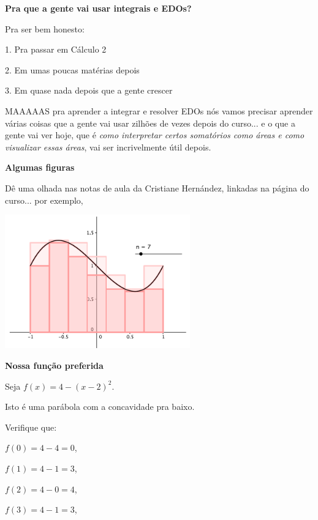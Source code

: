 \documentclass[oneside,12pt]{article}
\begin{document}
\newpage

{\bf Pra que a gente vai usar integrais e EDOs?}

Pra ser bem honesto:

1. Pra passar em Cálculo 2

2. Em umas poucas matérias depois

3. Em quase nada depois que a gente crescer

\msk

MAAAAAS pra aprender a integrar e resolver EDOs nós vamos precisar
aprender várias coisas que a gente vai usar zilhões de vezes depois do
curso... e o que a gente vai ver hoje, que é {\sl como interpretar
  certos somatórios como áreas e como visualizar essas áreas}, vai ser
incrivelmente útil depois.



\newpage

{\bf Algumas figuras}

Dê uma olhada nas notas de aula da Cristiane Hernández, linkadas na
página do curso... por exemplo,


\includegraphics[width=8cm]{2020-1-C2/area-hernandez-1.png}


\newpage


{\bf Nossa função preferida}

Seja $f(x) = 4 - (x-2)^2$.

Isto é uma parábola com a concavidade pra baixo.

Verifique que:

$f(0)=4-4=0$,

$f(1)=4-1=3$,

$f(2)=4-0=4$,

$f(3)=4-1=3$,
\end{document}
